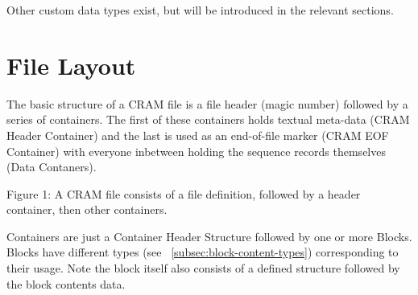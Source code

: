 \documentclass[a4paper]{article}
\begin{document}
Other custom data types exist, but will be introduced in the relevant sections.

\section{File Layout}

The basic structure of a CRAM file is a file header (magic number)
followed by a series of containers.  The first of these containers
holds textual meta-data (CRAM Header Container) and the last is used
as an end-of-file marker (CRAM EOF Container) with everyone inbetween
holding the sequence records themselves (Data Contaners).

\begin{center}

Figure 1: A CRAM file consists of a file definition, followed by a header container, then other containers.
\end{center}

Containers are just a Container Header Structure followed by one or
more Blocks.  Blocks have different types (see
~\ref{subsec:block-content-types}) corresponding to their usage.
Note the block itself also consists of a defined structure followed by
the block contents data.
\end{document}
